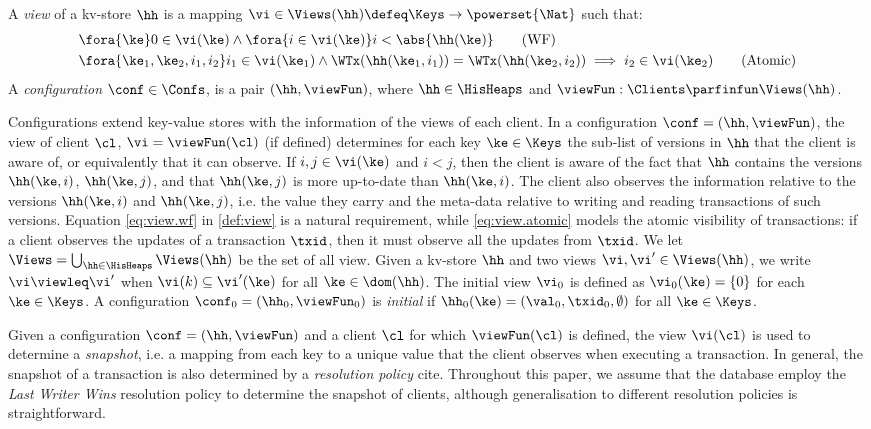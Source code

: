 \begin{definition}
\label{def:view}
\label{def:cuts}
\label{def:views}
\label{def:configuration}
A \emph{view} of a kv-store $\hh$ is a mapping  
$\vi \in \Views(\hh) \defeq \Keys \to\powerset{\Nat}$ such that:
\begin{align}
    & \fora{ \ke } 
    0 \in \vi(\ke) 
    \wedge \fora{ i \in \vi(\ke) } 
    i < \abs{ \hh(\ke) } 
    \tag{WF}
    \label{eq:view.wf}\\
    & 
    \fora{ \ke_1,\ke_2, i_1, i_2} 
	i_1 \in \vi(\ke_1) 
	\land \WTx(\hh(\ke_1, i_1)) = \WTx(\hh(\ke_2, i_2)) 
	\implies i_2 \in \vi(\ke_2)
	\tag{Atomic}
	\label{eq:view.atomic}
\end{align}
A \emph{configuration} $\conf \in \Confs$, is a pair $(\hh, \viewFun)$, 
where $\hh \in \HisHeaps$ and
$\viewFun : \Clients \parfinfun \Views(\hh)$. 
\end{definition}
Configurations extend key-value stores with the information of 
the views of each client. In a configuration $\conf = (\hh, \viewFun)$, the view of client 
$\cl$, $\vi = \viewFun(\cl)$ (if defined) determines for each key $\ke \in \Keys$ the sub-list of versions in $\hh$ 
that the client is aware of, or equivalently that it can observe. If $i,j \in \vi(\ke)$ and $i < j$, then the client is 
aware of the fact that $\hh$ contains the versions $\hh(\ke, i)$, $\hh(\ke, j)$, and that $\hh(\ke, j)$ is more 
up-to-date than $\hh(\ke, i)$. The client also observes the information relative to the versions $\hh(\ke, i)$ and 
$\hh(\ke, j)$, i.e. the value they carry and the meta-data relative to writing and reading transactions of such 
versions. 
Equation \eqref{eq:view.wf} in \cref{def:view} is a natural requirement, while \eqref{eq:view.atomic} 
models the atomic visibility of transactions: if a client observes the updates of a transaction $\txid$, then 
it must observe all the updates from $\txid$. 
We let $\Views = \bigcup_{\hh \in \HisHeaps} \Views(\hh)$ be the set of all view. 
Given a kv-store $\hh$ and two views $\vi, \vi' \in \Views(\hh)$, 
we write $\vi \viewleq \vi'$ when $\vi(k) \subseteq \vi'(\ke)$ for all $\ke \in \dom(\hh)$. 
The initial view $\vi_{0}$ is defined as $\vi_{0}(\ke) = \{0\}$ for each $\ke \in \Keys$.
A configuration $\conf_{0} = (\hh_{0}, \viewFun_{0})$ is
\emph{initial} if $\hh_{0}(\ke) = (\val_0, \txid_0, \emptyset)$ for all $\ke \in \Keys$.

Given a configuration $\conf = (\hh, \viewFun)$ and a client $\cl$ for which 
$\viewFun(\cl)$ is defined, the view $\vi(\cl)$ is used to determine a \emph{snapshot}, i.e. 
a mapping from each key to a unique value that the client observes when executing a transaction. 
In general, the snapshot of a transaction is also determined by a \emph{resolution policy} 
cite{}. Throughout this paper, we assume that the database employ the \emph{Last Writer 
Wins} \cite{} resolution policy to determine the snapshot of clients, although generalisation 
to different resolution policies is straightforward.

